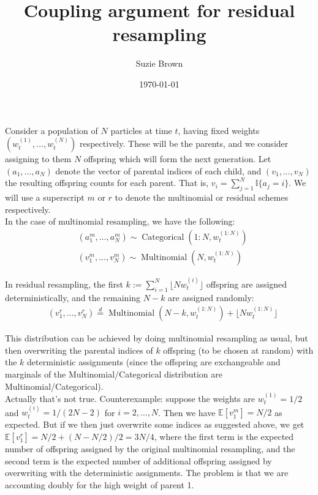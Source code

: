 \documentclass[fleqn]{article}
\title{Coupling argument for residual resampling}
\author{Suzie Brown}
\date{\today}
\newcommand{\E}{\mathbb{E}}
\newcommand{\eqdist}{\overset{d}{=}}
\newcommand{\I}[1]{\mathbb{I}\{#1\}}
\newcommand{\Mn}{\operatorname{Multinomial}}
\newcommand{\Cat}{\operatorname{Categorical}}
\newcommand{\wt}[2][t]{w_{#1}^{(#2)}}
\begin{document}
\maketitle
\thispagestyle{fancy}

Consider a population of $N$ particles at time $t$, having fixed weights $(\wt{1},\dots, \wt{N})$ respectively. These will be the parents, and we consider assigning to them $N$ offspring which will form the next generation. 
Let $(a_1, \dots, a_N)$ denote the vector of parental indices of each child, and $(v_1, \dots, v_N)$ the resulting offspring counts for each parent. That is, $v_i = \sum_{j=1}^N \I{a_j = i} $. We will use a superscript $m$ or $r$ to denote the multinomial or residual schemes respectively.\\

In the case of multinomial resampling, we have the following:
\begin{align*}
& (a_1^m, \dots, a_N^m) \sim \Cat(1:N, \wt{1:N}) \\
& (v_1^m, \dots, v_N^m) \sim \Mn(N, \wt{1:N})
\end{align*}

In residual resampling, the first $k := \sum_{i=1}^N \lfloor N\wt{i} \rfloor$ offspring are assigned deterministically, and the remaining $N-k$ are assigned randomly:
\begin{align*}
& (v_1^r, \dots, v_N^r) \eqdist \Mn(N-k, \wt{1:N}) + \lfloor N \wt{1:N} \rfloor
\end{align*}

This distribution can be achieved by doing multinomial resampling as usual, but then overwriting the parental indices of $k$ offspring (to be chosen at random) with the $k$ deterministic assignments (since the offspring are exchangeable and marginals of the Multinomial/Categorical distribution are Multinomial/Categorical).\\

\color{red}
Actually that's not true. Counterexample: suppose the weights are $\wt{1} = 1/2$ and $\wt{i} = 1/(2N-2)$ for $i=2,\dots,N$. Then we have $\E[v_1^m] = N/2$ as expected. But if we then just overwrite some indices as suggested above, we get $\E[v_1^r] = N/2 + (N-N/2)/2 = 3N/4$, where the first term is the expected number of offspring assigned by the original multinomial resampling, and the second term is the expected number of additional offspring assigned by overwriting with the deterministic assignments. The problem is that we are accounting doubly for the high weight of parent 1.\\
\end{document}
